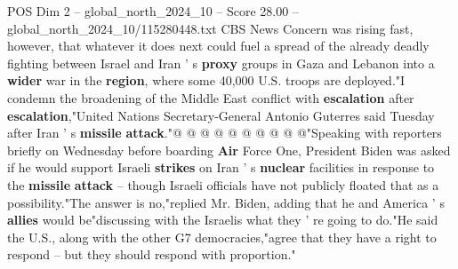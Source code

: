 \begin{textsample}{POS Dim 2 – global\_north\_2024\_10 – Score 28.00 – global\_north\_2024\_10/115280448.txt}
CBS News Concern was rising fast, however, that whatever it does next could fuel a spread of the already deadly fighting between Israel and Iran ' s \textbf{proxy} groups in Gaza and Lebanon into a \textbf{wider} war in the \textbf{region}, where some 40,000 U.S. troops are deployed."I condemn the broadening of the Middle East conflict with \textbf{escalation} after \textbf{escalation},"United Nations Secretary-General Antonio Guterres said Tuesday after Iran ' s \textbf{missile} \textbf{attack}."@ @ @ @ @ @ @ @ @ @"Speaking with reporters briefly on Wednesday before boarding \textbf{Air} Force One, President Biden was asked if he would support Israeli \textbf{strikes} on Iran ' s \textbf{nuclear} facilities in response to the \textbf{missile} \textbf{attack} -- though Israeli officials have not publicly floated that as a possibility."The answer is no,"replied Mr.
Biden, adding that he and America ' s \textbf{allies} would be"discussing with the Israelis what they ' re going to do."He said the U.S., along with the other G7 democracies,"agree that they have a right to respond -- but they should respond with proportion."

\end{textsample}
